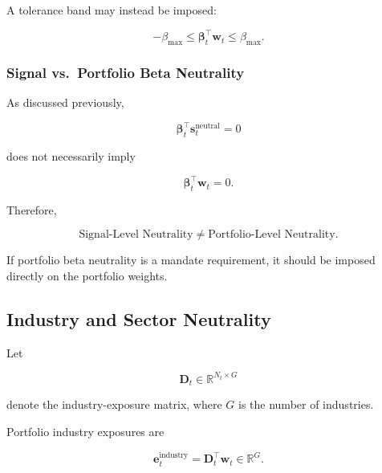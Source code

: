 \documentclass[11pt,a4paper]{article}
\begin{document}
A tolerance band may instead be imposed:

\begin{equation}
\boxed{
-\beta_{\max}
\leq
\boldsymbol{\beta}_t^{\top}
\mathbf{w}_t
\leq
\beta_{\max}.
}
\end{equation}


\subsubsection{Signal vs.\ Portfolio Beta Neutrality}

As discussed previously,

\begin{equation}
\boldsymbol{\beta}_t^\top
\mathbf{s}_t^{\mathrm{neutral}}
=
0
\end{equation}

does not necessarily imply

\begin{equation}
\boldsymbol{\beta}_t^\top
\mathbf{w}_t
=
0.
\end{equation}

Therefore,

\begin{equation}
\boxed{
\text{Signal-Level Neutrality}
\neq
\text{Portfolio-Level Neutrality}.
}
\end{equation}

If portfolio beta neutrality is a mandate requirement, it should be imposed
directly on the portfolio weights.


\subsection{Industry and Sector Neutrality}
\label{subsec:portfolio_industry_neutrality}

Let

\begin{equation}
\mathbf{D}_t
\in
\mathbb{R}^{N_t\times G}
\end{equation}

denote the industry-exposure matrix, where $G$ is the number of industries.

Portfolio industry exposures are

\begin{equation}
\boxed{
\mathbf{e}_t^{\mathrm{industry}}
=
\mathbf{D}_t^\top
\mathbf{w}_t
\in
\mathbb{R}^{G}.
}
\end{equation}
\end{document}
